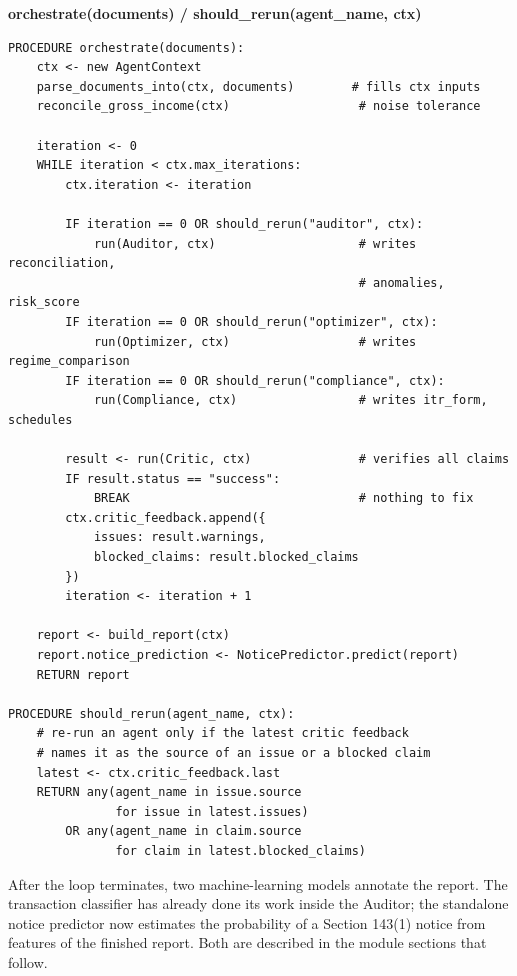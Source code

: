 \documentclass[12pt, a4paper, oneside]{report}
\newcommand{\algname}[1]{\par\vspace{0.6em}\noindent\textbf{\ttfamily #1}\nopagebreak}
\begin{document}
\algname{orchestrate(documents) \quad / \quad should\_rerun(agent\_name, ctx)}
\begin{lstlisting}[style=pseudo]
PROCEDURE orchestrate(documents):
    ctx <- new AgentContext
    parse_documents_into(ctx, documents)        # fills ctx inputs
    reconcile_gross_income(ctx)                  # noise tolerance

    iteration <- 0
    WHILE iteration < ctx.max_iterations:
        ctx.iteration <- iteration

        IF iteration == 0 OR should_rerun("auditor", ctx):
            run(Auditor, ctx)                    # writes reconciliation,
                                                 # anomalies, risk_score
        IF iteration == 0 OR should_rerun("optimizer", ctx):
            run(Optimizer, ctx)                  # writes regime_comparison
        IF iteration == 0 OR should_rerun("compliance", ctx):
            run(Compliance, ctx)                 # writes itr_form, schedules

        result <- run(Critic, ctx)               # verifies all claims
        IF result.status == "success":
            BREAK                                # nothing to fix
        ctx.critic_feedback.append({
            issues: result.warnings,
            blocked_claims: result.blocked_claims
        })
        iteration <- iteration + 1

    report <- build_report(ctx)
    report.notice_prediction <- NoticePredictor.predict(report)
    RETURN report

PROCEDURE should_rerun(agent_name, ctx):
    # re-run an agent only if the latest critic feedback
    # names it as the source of an issue or a blocked claim
    latest <- ctx.critic_feedback.last
    RETURN any(agent_name in issue.source
               for issue in latest.issues)
        OR any(agent_name in claim.source
               for claim in latest.blocked_claims)
\end{lstlisting}

After the loop terminates, two machine-learning models annotate the report. The
transaction classifier has already done its work inside the Auditor; the
standalone notice predictor now estimates the probability of a Section 143(1)
notice from features of the finished report. Both are described in the module
sections that follow.
\end{document}
